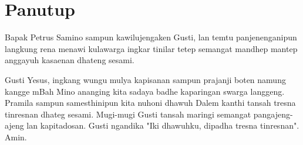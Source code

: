 \documentclass[12pt,a4paper]{article}
\begin{document}
\section*{Panutup}
Bapak Petrus Samino sampun kawilujengaken Gusti, lan temtu panjenenganipun langkung rena menawi kulawarga ingkar tinilar tetep semangat mandhep mantep anggayuh kasaenan dhateng sesami.

Gusti Yesus, ingkang wungu mulya kapisanan sampun prajanji boten namung kangge mBah Mino ananging kita sadaya badhe kaparingan swarga langgeng. Pramila sampun samesthinipun kita nuhoni dhawuh Dalem kanthi tansah tresna tinresnan dhateg sesami. Mugi-mugi Gusti tansah maringi semangat pangajeng-ajeng lan kapitadosan. 
Gusti ngandika "Iki dhawuhku, dipadha tresna tinresnan".
Amin.
\end{document}
